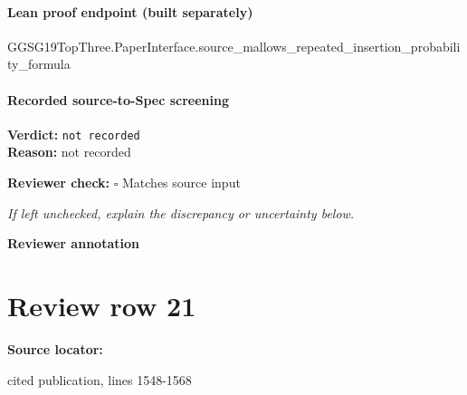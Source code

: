 \documentclass[10pt]{article}
\newcommand{\reviewerbox}{%
  \par\noindent\fbox{\parbox{0.96\linewidth}{\rule{0pt}{0.38in}}}\par
}
\newcommand{\reviewmatch}[1]{%
  \par\noindent\textbf{Reviewer check:} $\square$\; #1\par
  \noindent\emph{If left unchecked, explain the discrepancy or uncertainty below.}\par
}
\begin{document}
\paragraph{Lean proof endpoint (built separately)}\begin{ReviewVerbatim}
GGSG19TopThree.PaperInterface.source_mallows_repeated_insertion_probability_formula
\end{ReviewVerbatim}

\paragraph{Recorded source-to-Spec screening}
\textbf{Verdict:} \texttt{not recorded}
\\
\textbf{Reason:} not recorded
\reviewmatch{Matches source input}
\noindent\textbf{Reviewer annotation}\par
\reviewerbox
\clearpage
\hypertarget{source-claim-b4c9d86dce53081b}{}
\section*{Review row 21}
\textbf{Source locator:} {\footnotesize\raggedright cited publication, lines 1548-\allowbreak{}1568\par}
\end{document}
